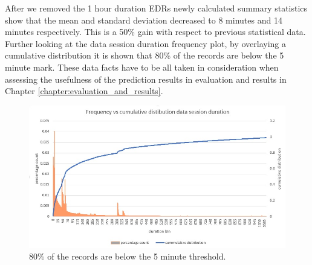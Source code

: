 \documentclass[12pt, a4paper]{report}
\theoremstyle{definition}
\theoremstyle{definition}%
\theoremstyle{definition}%
\theoremstyle{definition}%
\theoremstyle{definition}%
\theoremstyle{definition}%
\begin{document}
After we removed the 1 hour duration EDRs newly calculated summary statistics show that the mean and standard deviation decreased to 8 minutes and 14 minutes respectively. This is a 50\% gain with respect to previous statistical data. Further looking at the data session duration frequency plot, by overlaying a cumulative distribution it is shown that 80\% of the records are below the 5 minute mark. These data facts have to be all taken in consideration when assessing the usefulness of the prediction results in evaluation and results in Chapter \ref{chapter:evaluation_and_results}. 



\begin{table}[h]
	\label{table:summary statistics_02}
	\centering
	\caption{Basic summary statistics of main EDR dataset after removing 1 hour duration EDRs.} 
\end{table}

 
 \begin{figure}
 	\includegraphics[scale=0.75]{data_session_duration.jpg}
 	\centering
 	\caption[Data session duration cummultive distribution]{80\% of the records are below the 5 minute threshold.}
 	\label{fig:data_session_duration}
 \end{figure}
 
\end{document}
